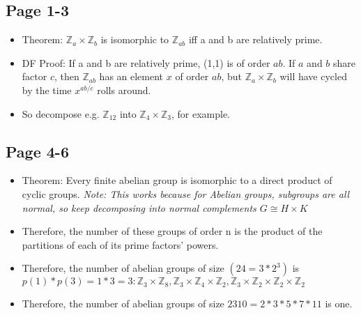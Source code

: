 \documentclass[11pt, oneside]{article}   	%
\begin{document}
\subsection{Page 1-3}
\begin{itemize}
\item Theorem: $\mathbb{Z}_a \times \mathbb{Z}_b$ is isomorphic to $\mathbb{Z}_{ab}$ iff a and b are relatively prime.
\item DF Proof: If a and b are relatively prime, (1,1) is of order $ab$.  If $a$ and $b$ share factor $c$, then $\mathbb{Z}_{ab}$ has an element $x$ of order $ab$, but $\mathbb{Z}_a \times \mathbb{Z}_b$ will have cycled by the time $x^{ab / c}$ rolls around.
\item So decompose e.g. $\mathbb{Z}_{12}$ into $\mathbb{Z}_4 \times \mathbb{Z}_3$, for example.
\end{itemize}

\subsection{Page 4-6}
\begin{itemize}
\item Theorem: Every finite abelian group is isomorphic to a direct product of cyclic groups.  \emph{Note: This works because for Abelian groups, subgroups are all normal, so keep decomposing into normal complements $G \cong H \times K$}
\item Therefore, the number of these groups of order n is the product of the partitions of each of its prime factors' powers.
\item Therefore, the number of abelian groups of size $(24 = 3* 2^3)$ is $p(1) * p(3) = 1 * 3 = 3: \mathbb{Z}_3  \times \mathbb{Z}_8, \mathbb{Z}_3  \times \mathbb{Z}_4 \times \mathbb{Z}_2, \mathbb{Z}_3  \times \mathbb{Z}_2 \times \mathbb{Z}_2 \times \mathbb{Z}_2$
\item Therefore, the number of abelian groups of size $2310 = 2 * 3 *5 * 7 * 11$ is one.
\end{itemize}
\end{document}
